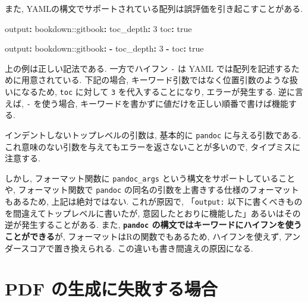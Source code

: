 \documentclass[
  nomag]{bxjsbook}
\newenvironment{Shaded}{\begin{snugshade}}{\end{snugshade}}
\newcommand{\AttributeTok}[1]{\textcolor[rgb]{0.77,0.63,0.00}{#1}}
\newcommand{\CharTok}[1]{\textcolor[rgb]{0.31,0.60,0.02}{#1}}
\newcommand{\DecValTok}[1]{\textcolor[rgb]{0.00,0.00,0.81}{#1}}
\newcommand{\FunctionTok}[1]{\textcolor[rgb]{0.00,0.00,0.00}{#1}}
\newcommand{\KeywordTok}[1]{\textcolor[rgb]{0.13,0.29,0.53}{\textbf{#1}}}
\theoremstyle{definition}
\theoremstyle{definition}
\theoremstyle{definition}
\theoremstyle{remark}
\begin{document}
また, YAMLの構文でサポートされている配列は誤評価を引き起こすことがある.

\begin{Shaded}
\begin{Highlighting}[]
\FunctionTok{output}\KeywordTok{:}
\AttributeTok{  bookdown:}\FunctionTok{:gitbook}\KeywordTok{:}
\AttributeTok{    }\FunctionTok{toc\_depth}\KeywordTok{:}\AttributeTok{ }\DecValTok{3}
\AttributeTok{    }\FunctionTok{toc}\KeywordTok{:}\AttributeTok{ }\CharTok{true}
\end{Highlighting}
\end{Shaded}

\begin{Shaded}
\begin{Highlighting}[]
\FunctionTok{output}\KeywordTok{:}
\AttributeTok{  bookdown:}\FunctionTok{:gitbook}\KeywordTok{:}
\AttributeTok{    }\KeywordTok{{-}}\AttributeTok{ }\FunctionTok{toc\_depth}\KeywordTok{:}\AttributeTok{ }\DecValTok{3}
\AttributeTok{    }\KeywordTok{{-}}\AttributeTok{ }\FunctionTok{toc}\KeywordTok{:}\AttributeTok{ }\CharTok{true}
\end{Highlighting}
\end{Shaded}

上の例は正しい記法である. 一方でハイフン \texttt{-} は YAML
では配列を記述するために用意されている. 下記の場合,
キーワード引数ではなく位置引数のような扱いになるため, \texttt{toc}
に対して \texttt{3} を代入することになり, エラーが発生する. 逆に言えば,
\texttt{-} を使う場合,
キーワードを書かずに値だけを正しい順番で書けば機能する.

インデントしないトップレベルの引数は, 基本的に \texttt{pandoc}
に与える引数である.
これ意味のない引数を与えてもエラーを返さないことが多いので,
タイプミスに注意する.

しかし, フォーマット関数に \texttt{pandoc\_args}
という構文をサポートしていることや, フォーマット関数で \texttt{pandoc}
の同名の引数を上書きする仕様のフォーマットもあるため,
上記は絶対ではない. これが原因で, 「\texttt{output:}
以下に書くべきものを間違えてトップレベルに書いたが,
意図したとおりに機能した」あるいはその逆が発生することがある. また,
\textbf{\texttt{pandoc}
の構文ではキーワードにハイフンを使うことができる}が,
フォーマットはRの関数でもあるため, ハイフンを使えず,
アンダースコアで置き換えられる. この違いも書き間違えの原因になる.

\hypertarget{pdf-ux306eux751fux6210ux306bux5931ux6557ux3059ux308bux5834ux5408}{%
\section{PDF
の生成に失敗する場合}\label{pdf-ux306eux751fux6210ux306bux5931ux6557ux3059ux308bux5834ux5408}}
\end{document}
